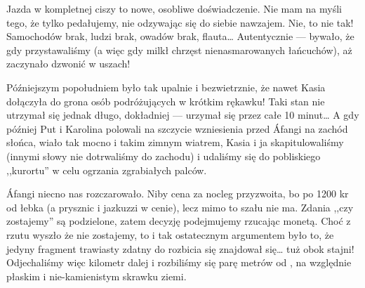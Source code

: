 
Jazda w kompletnej ciszy to nowe, osobliwe doświadczenie. Nie mam na myśli tego, że tylko pedałujemy, nie odzywając się do siebie nawzajem. Nie, to nie tak! Samochodów brak, ludzi brak, owadów brak, flauta… Autentycznie --- bywało, że gdy przystawaliśmy (a więc gdy milkł chrzęst nienasmarowanych łańcuchów), aż zaczynało dzwonić w uszach!

Późniejszym popołudniem było tak upalnie i bezwietrznie, że nawet Kasia dołączyła do grona osób podróżujących w krótkim rękawku! Taki stan nie utrzymał się jednak długo, dokładniej --- urzymał się przez całe 10 minut… A gdy później Put i Karolina polowali na szczycie wzniesienia przed Áfangi na zachód słońca, wiało tak mocno i takim zimnym wiatrem, Kasia i ja skapitulowaliśmy (innymi słowy nie dotrwaliśmy do zachodu) i udaliśmy się do pobliskiego ,,kurortu'' w celu ogrzania zgrabiałych palców.

Áfangi niecno nas rozczarowało. Niby cena za nocleg przyzwoita, bo po 1200 kr od łebka (a prysznic i jazkuzzi w cenie), lecz mimo to szału nie ma. Zdania ,,czy zostajemy'' są podzielone, zatem decyzję podejmujemy rzucając monetą. Choć z rzutu wyszło że nie zostajemy, to i tak ostatecznym argumentem było to, że jedyny fragment trawiasty zdatny do rozbicia się znajdował się… tuż obok stajni! Odjechaliśmy więc kilometr dalej i rozbiliśmy się parę metrów od , na względnie płaskim i nie-kamienistym skrawku ziemi.

